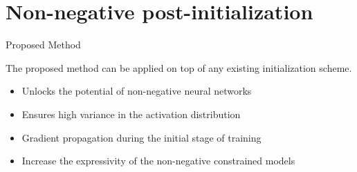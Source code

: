 \section{Non-negative post-initialization}

\begin{frame}{Proposed Method}

  
  The proposed method can be applied on top of any existing initialization
  scheme.

  \begin{itemize}
  \item Unlocks the potential of non-negative neural networks
  \item Ensures high variance in the activation distribution
  \item Gradient propagation during the initial stage of training
  \item Increase the expressivity of the non-negative constrained models
  \end{itemize}
\end{frame}


